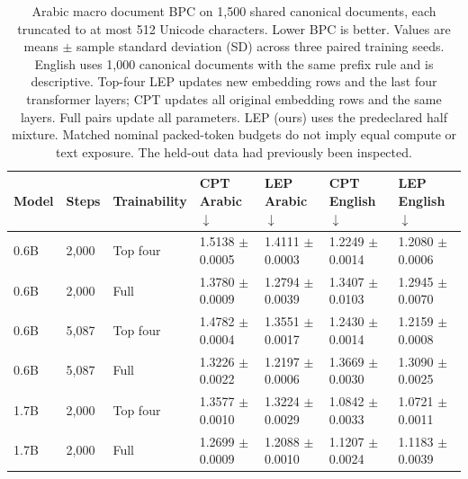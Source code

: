 \begin{table}[t]
\centering
\small
\setlength{\tabcolsep}{4pt}
\begin{tabular}{@{}lllllll@{}}
\toprule
Model & Steps & Trainability & CPT Arabic $\downarrow$ & LEP Arabic $\downarrow$ & CPT English $\downarrow$ & LEP English $\downarrow$ \\
\midrule
0.6B & 2,000 & Top four & 1.5138 $\pm$ 0.0005 & 1.4111 $\pm$ 0.0003 & 1.2249 $\pm$ 0.0014 & 1.2080 $\pm$ 0.0006 \\
0.6B & 2,000 & Full & 1.3780 $\pm$ 0.0009 & 1.2794 $\pm$ 0.0039 & 1.3407 $\pm$ 0.0103 & 1.2945 $\pm$ 0.0070 \\
0.6B & 5,087 & Top four & 1.4782 $\pm$ 0.0004 & 1.3551 $\pm$ 0.0017 & 1.2430 $\pm$ 0.0014 & 1.2159 $\pm$ 0.0008 \\
0.6B & 5,087 & Full & 1.3226 $\pm$ 0.0022 & 1.2197 $\pm$ 0.0006 & 1.3669 $\pm$ 0.0030 & 1.3090 $\pm$ 0.0025 \\
1.7B & 2,000 & Top four & 1.3577 $\pm$ 0.0010 & 1.3224 $\pm$ 0.0029 & 1.0842 $\pm$ 0.0033 & 1.0721 $\pm$ 0.0011 \\
1.7B & 2,000 & Full & 1.2699 $\pm$ 0.0009 & 1.2088 $\pm$ 0.0010 & 1.1207 $\pm$ 0.0024 & 1.1183 $\pm$ 0.0039 \\
\bottomrule
\end{tabular}
\caption{Arabic macro document BPC on 1,500 shared canonical documents, each truncated to at most 512 Unicode characters. Lower BPC is better. Values are means $\pm$ sample standard deviation (SD) across three paired training seeds. English uses 1,000 canonical documents with the same prefix rule and is descriptive. Top-four LEP updates new embedding rows and the last four transformer layers; CPT updates all original embedding rows and the same layers. Full pairs update all parameters. LEP (ours) uses the predeclared half mixture. Matched nominal packed-token budgets do not imply equal compute or text exposure. The held-out data had previously been inspected. }
\label{tab:rebuttal-fair-estimates}
\end{table}
